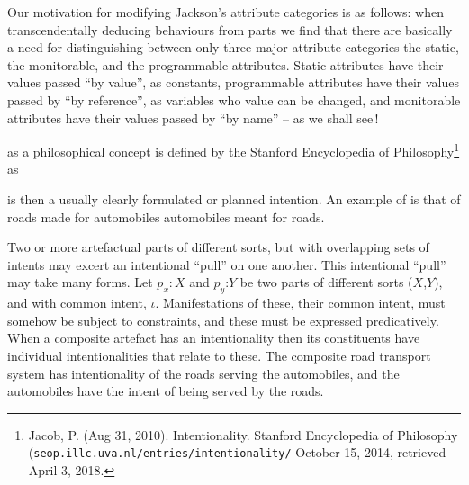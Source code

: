 \noindent
{}

\begynd
\pind Our motivation for modifying Jackson's attribute categories is
      as follows:
\begynd
\pind when transcendentally deducing behaviours from parts
\pind we find that there are basically a need for distinguishing 
\pind between only three major attribute categories
\begynd
\pind the static,
\pind the monitorable, and
\pind the programmable attributes.
\afslut
\pind Static attributes have their values passed ``by value'',  as constants,
\pind programmable attributes  have their values passed by ``by
      reference'', as variables who value can be changed, and 
\pind monitorable attributes  have their values passed by ``by
      name'' --  as we shall see\,!
\afslut
\afslut

\label{Intentional Pull}

\begynd
\pind {} as a philosophical concept 
is defined by the Stanford Encyclopedia of
Philosophy\footnote{Jacob, P. (Aug 31, 2010). Intentionality. Stanford 
  Encyclopedia of Philosophy
  (\texttt{\-seop.\-illc.\-uva.\-nl/\-en\-tries/\-in\-ten\-tion\-a\-li\-ty/} October 15, 2014,
  retrieved April 3, 2018.} as 

\pind {} is then a usually clearly formulated or planned intention.
\pind An example of  is that of roads made for automobiles
       automobiles meant for roads.
\afslut

\mnewfoil

\begynd
\pind {} Two or more artefactual parts of different sorts, but
with overlapping sets of intents may 
excert an intentional ``pull'' on one another. This intentional ``pull'' may take many forms. Let $p_x$$:X$ and
$p_y$:$Y$ be two parts of different sorts ($X$,$Y$), and with common intent, $\iota$. Manifestations of these, their common
intent, must somehow be subject to constraints, and these must be expressed predicatively.
When a composite artefact
has an intentionality then its constituents have individual
intentionalities that relate to
these. The composite road transport system has intentionality of the roads serving the automobiles, and
the automobiles have the intent of being served by the roads.
\afslut

